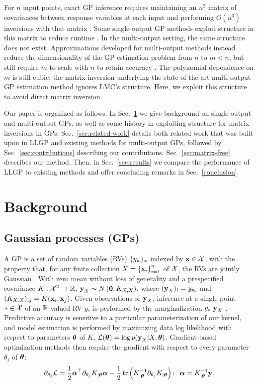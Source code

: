 \documentclass{article}
\begin{document}
For $n$ input points, exact GP inference requires maintaining an $n^2$  matrix of covariances between response variables at each input and performing $O(n^3)$ inversions with that matrix \cite{williams1996gaussian}. Some single-output GP methods exploit structure in this matrix to reduce runtime \cite{msgp}. In the multi-output setting, the same structure does not exist. Approximations developed for multi-output methods instead reduce the dimensionality of the GP estimation problem from $n$ to $m<n$, but still require $m$ to scale with $n$ to retain accuracy \cite{nguyen2014collaborative}. The polynomial dependence on $m$ is still cubic: the matrix inversion underlying the state-of-the-art multi-output GP estimation method ignores LMC's structure. Here, we exploit this structure to avoid direct matrix inversion.


Our paper is organized as follows. In Sec.~\ref{sec:background} we give background on single-output and multi-output GPs, as well as some history in exploiting structure for matrix inversions in GPs. Sec.~\ref{sec:related-work} details both related work that was built upon in LLGP and existing methods for multi-output GPs, followed by Sec.~\ref{sec:contributions} describing our contributions. Sec.~\ref{sec:matrix-free} describes our method. Then, in Sec.~\ref{sec:results} we compare the performance of LLGP to existing methods and offer concluding remarks in Sec.~\ref{conclusion}.


\section{Background}
\label{sec:background}

\subsection{Gaussian processes (GPs)}

A GP is a set of random variables (RVs) $\{y_{\textbf{x}}\}_{\textbf{x}}$ indexed by $\textbf{x}\in\mathcal{X}$, with the property that, for any finite collection $X=\left\{ \textbf{x}_i \right\}_{ i=1 }^{ n }$ of $\mathcal{X}$, the RVs are jointly Gaussian \cite{williams1996gaussian}. With zero mean without loss of generality and a prespecified covariance $K:\mathcal{X}^2\rightarrow\mathbb{R}$, $\textbf{y}_X\sim N\left({\textbf{0}, K_{X, X}}\right)$, where $(\textbf{y}_X)_i=y_{\textbf{x}_i}$ and $(K_{X,X})_{ij}=K(\textbf{x}_i,\textbf{x}_j)$. Given observations of $\textbf{y}_X$, inference at a single point $*\in\mathcal{X}$ of an $\mathbb{R}$-valued RV $y_*$ is performed by the marginalization $y_*|\textbf{y}_X$ \cite{williams1996gaussian}.
Predictive accuracy is sensitive to a particular parameterization of our kernel, and model estimation is performed by maximizing data log likelihood with respect to parameters ${\boldsymbol\theta}$ of $K$, $\mathcal{L}({\boldsymbol\theta})=\log p(\textbf{y}_{X}|X,{\boldsymbol\theta})$. Gradient-based optimization methods then require the gradient with respect to every parameter $\theta_j$ of ${\boldsymbol\theta}$:
\begin{align}
\partial_{\theta_j}\mathcal{L} = \frac{1}{2}{\boldsymbol\alpha}^\top\partial_{\theta_j}K_{|{\boldsymbol\theta}}{\boldsymbol\alpha} -\frac{1}{2}\operatorname{tr}\left({K_{|{\boldsymbol\theta}}^{-1}\partial_{\theta_j}K_{|{\boldsymbol\theta}}}\right);\;\; {\boldsymbol\alpha}=K_{|{\boldsymbol\theta}}^{-1}\textbf{y}.\label{llgradient}
\end{align}
\end{document}
